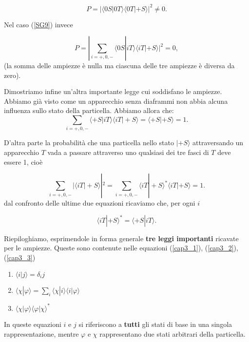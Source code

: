 \begin{equation}
P= | \langle 0S | 0T \rangle \langle 0T | +S \rangle  |^2 \neq 0 .
\end{equation}

Nel caso (\ref{SG9}) invece

\begin{equation}
P= |\sum \limits_{i=+,0,-}\langle 0S | iT \rangle \langle iT | +S \rangle |^2 =0 ,
\end{equation}
(la somma delle ampiezze è nulla ma ciascuna delle tre ampiezze è diversa da zero).

Dimostriamo infine un'altra importante legge cui soddisfano le ampiezze. Abbiamo già visto come un apparecchio senza diaframmi non abbia alcuna influenza sullo stato della particella. Abbiamo allora che:
\begin{equation}
\sum \limits_{i=+,0,-}\langle +S | iT \rangle \langle iT | +S \rangle = \langle +S | +S \rangle =1 .
\end{equation}

D'altra parte la probabilità che una particella nello stato $| +S \rangle$ attraversando un apparecchio $T$ vada a passare attraverso uno qualsiasi dei tre fasci di $T$ deve essere 1, cioè

\begin{equation}
\sum \limits_{i=+,0,-}|\langle iT | +S \rangle|^2= \sum \limits_{i=+,0,-} \langle iT | +S \rangle ^* \langle iT | +S \rangle= 1 .
\end{equation}
dal confronto delle ultime due equazioni ricaviamo che, per ogni $i$

\begin{equation}
 \langle iT | +S \rangle ^* = \langle +S | iT \rangle .
 \label{cap3_3}
\end{equation}

Riepiloghiamo, esprimendole in forma generale \textbf{tre leggi importanti} ricavate per le ampiezze.
Queste sono contenute nelle equazioni (\ref{cap3_1}), (\ref{cap3_2}), (\ref{cap3_3})
\begin{enumerate}
\item $\langle i | j \rangle=\delta_ij$
\item $\langle \chi | \varphi \rangle=\sum \limits_{i} \langle \chi | i \rangle \langle i | \varphi \rangle$
\item $\langle \chi | \varphi \rangle \langle \varphi | \chi \rangle ^*$
\end{enumerate}

In queste equazioni $i$ e $j$ si riferiscono a \textbf{tutti} gli stati di base in una singola rappresentazione, mentre $\varphi$ e $\chi$ rappresentano due stati arbitrari della particella.


